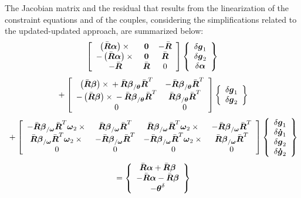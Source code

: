 \documentclass[10pt,dvips,fleqn]{report}
\newcommand{\T}[1]{\boldsymbol{#1}}
\begin{document}
\noindent
The Jacobian matrix and the residual that results from the linearization
of the constraint equations and of the couples, considering
the simplifications related to the updated-updated approach,
are summarized below:
\begin{equation}
	\sqbr{\matr{ccc}{
	\plbr{\bar{\T{R}}\T{\alpha}}\times{} & \T{0} & - \bar{\T{R}} \\
	- \plbr{\bar{\T{R}}\T{\alpha}}\times{} & \T{0} & \bar{\T{R}} \\
	- \bar{\T{R}} & \bar{\T{R}} & 0
	}}\cubr{\cvvect{
		\delta\T{g}_1 \\
		\delta\T{g}_2 \\
		\delta\T{\alpha} \\
	}}
\end{equation}
\begin{equation}
	\mbox{} + \sqbr{\matr{cc}{
	\plbr{\bar{\T{R}}\T{\beta}}\times{} 
		+ \bar{\T{R}}\T{\beta}_{/\T{\theta}}\bar{\T{R}}^T &
		- \bar{\T{R}}\T{\beta}_{/\T{\theta}}\bar{\T{R}}^T \\
	- \plbr{\bar{\T{R}}\T{\beta}}\times{}
		- \bar{\T{R}}\T{\beta}_{/\T{\theta}}\bar{\T{R}}^T &
		\bar{\T{R}}\T{\beta}_{/\T{\theta}}\bar{\T{R}}^T \\
	0 & 0 
	}}\cubr{\cvvect{
		\delta\T{g}_1 \\
		\delta\T{g}_2 \\
	}}
\end{equation}
\begin{equation}
 	\mbox{} + \sqbr{\matr{cccc}{
		- \bar{\T{R}}\T{\beta}_{/\T{\omega}}\bar{\T{R}}^T\T{\omega}_2\times{} &
		\bar{\T{R}}\T{\beta}_{/\T{\omega}}\bar{\T{R}}^T &
		\bar{\T{R}}\T{\beta}_{/\T{\omega}}\bar{\T{R}}^T\T{\omega}_2\times{} &
		- \bar{\T{R}}\T{\beta}_{/\T{\omega}}\bar{\T{R}}^T \\
		\bar{\T{R}}\T{\beta}_{/\T{\omega}}\bar{\T{R}}^T\T{\omega}_2\times{} &
		- \bar{\T{R}}\T{\beta}_{/\T{\omega}}\bar{\T{R}}^T &
		- \bar{\T{R}}\T{\beta}_{/\T{\omega}}\bar{\T{R}}^T\T{\omega}_2\times{} &
		\bar{\T{R}}\T{\beta}_{/\T{\omega}}\bar{\T{R}}^T \\
	0 & 0 & 0 & 0
	}}\cubr{\cvvect{
		\delta\T{g}_1 \\
		\delta\T{\dot{g}}_1 \\
		\delta\T{g}_2 \\
		\delta\T{\dot{g}}_2 \\
	}}
\end{equation}
\begin{equation}
 	\mbox{} = \cubr{\cvvect{
		\bar{\T{R}} \T{\alpha} + \bar{\T{R}} \T{\beta} \\
		- \bar{\T{R}} \T{\alpha} - \bar{\T{R}} \T{\beta} \\
		- \T{\theta}^{\delta}
	}}
\end{equation}
\end{document}
